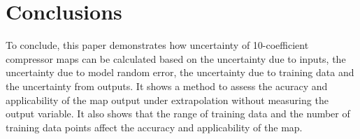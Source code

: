 \section{Conclusions} \label{sec:concl}

To conclude, this paper demonstrates how uncertainty of 10-coefficient compressor maps can be calculated based on the uncertainty due to inputs, the uncertainty due to model random error, the uncertainty due to training data and the uncertainty from outputs. It shows a method to assess the acuracy and applicability of the map output under extrapolation without measuring the output variable. It also shows that the range of training data and the number of training data points affect the accuracy and applicability of the map.